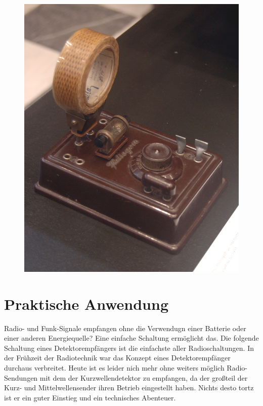 \begin{figure}
 \vspace{-6cm}
  \includegraphics[scale=0.1]{Kurzwellendetektor/Bilder/Heliogen_medium_wave_galena_radio.JPG}
 \vspace{-6cm}
\end{figure}

\section*{Praktische Anwendung}

Radio- und Funk-Signale empfangen ohne die Verwendugn einer Batterie oder einer anderen Energiequelle? Eine einfache Schaltung ermöglicht das. Die folgende Schaltung eines Detektorempfängers ist die einfachste aller Radioschaltungen. In der Frühzeit der Radiotechnik war das Konzept eines Detektorempfänger durchaus verbreitet. Heute ist es leider nich mehr ohne weiters möglich Radio-Sendungen mit dem der Kurzwellendetektor zu empfangen, da der großteil der Kurz- und Mittelwellensender ihren Betrieb eingestellt haben. Nichts desto tortz ist er ein guter Einstieg und ein technisches Abenteuer.


